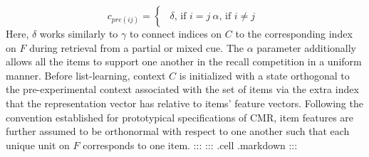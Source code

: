 {}\begin{equation} \label{eq:15} c_{pre(ij)} = \begin{cases} \begin{alignedat}{2} \delta \text{, if } i=j \ \alpha \text{, if } i \neq j \end{alignedat} \end{cases} \end{equation}\markdownRendererInterblockSeparator
{}Here, $\delta$ works similarly to $\gamma$ to connect indices on $C$ to the corresponding index on $F$ during retrieval from a partial or mixed cue. The $\alpha$ parameter additionally allows all the items to support one another in the recall competition in a uniform manner.\markdownRendererInterblockSeparator
{}Before list-learning, context $C$ is initialized with a state orthogonal to the pre-experimental context associated with the set of items via the extra index that the representation vector has relative to items' feature vectors. Following the convention established for prototypical specifications of CMR, item features are further assumed to be orthonormal with respect to one another such that each unique unit on $F$ corresponds to one item. :::\markdownRendererInterblockSeparator
{}::: {.cell .markdown} :::\relax